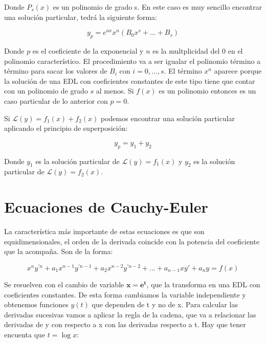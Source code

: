 \documentclass[a4paper,12pt,titlepage]{article}
\begin{document}
Donde $P_s(x)$ es un polinomio de grado s. En este caso es muy sencillo encontrar una solución particular, tedrá la siguiente forma:

\begin{equation}
    y_p = e^{ax} x^n (B_0x^s + ... + B_s)
\end{equation}

Donde $p$ es el coeficiente de la exponencial y $n$ es la multplicidad del 0 en el polinomio característico. El procedimiento va a ser igualar el polinomio término a término para sacar los valores de $B_i$ con $i=0,...,s$. El término $x^n$ aparece porque la solución de una EDL con coeficientes constantes de este tipo tiene que contar con un polinomio de grado $s$ al menos. Si $f(x)$ es un polinomio entonces es un caso particular de lo anterior con $p=0$.

\par Si $\mathcal{L}(y) = f_1(x) + f_2(x)$ podemos encontrar una solución particular aplicando el principio de superposición:

\begin{equation}
    y_p = y_1 + y_2
\end{equation}

Donde $y_1$ es la solución particular de $\mathcal{L}(y) = f_1(x)$ y $y_2$ es la solución particular de $\mathcal{L}(y) = f_2(x)$.

\section{Ecuaciones de Cauchy-Euler}

La característica más importante de estas ecuaciones es que son equidimensionales, el orden de la derivada coincide con la potencia del coeficiente que la acompaña. Son de la forma:

\begin{equation}
    x^n y^{'n} + a_1x^{n-1} y^{'n-1} + a_2 x^{n-2}y^{'n-2} + ...+ a_{n-1}xy' +a_ny = f(x)
\end{equation}

Se resuelven con el cambio de variable $\mathbf{x =e^t}$, que la transforma en una EDL con coeficientes constantes. De esta forma cambiamos la variable independiente y obtenemos funciones $y(t)$ que dependen de t y no de x. Para calcular las derivadas sucesivas vamos a aplicar la regla de la cadena, que va a relacionar las derivadas de y con respecto a x con las derivadas respecto a t. Hay que tener encuenta que $t=\log x$:
\end{document}

